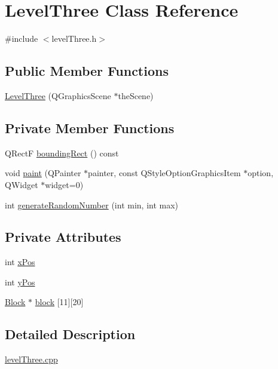 \hypertarget{class_level_three}{
\section{LevelThree Class Reference}
\label{class_level_three}
}


{\ttfamily \#include $<$levelThree.h$>$}\subsection*{Public Member Functions}
\begin{DoxyCompactItemize}
\item 
\hyperlink{class_level_three_a75bf86c7d294935953252f89586fb1d5}{LevelThree} (QGraphicsScene $\ast$theScene)
\end{DoxyCompactItemize}
\subsection*{Private Member Functions}
\begin{DoxyCompactItemize}
\item 
QRectF \hyperlink{class_level_three_a6c6267a96819454c27eb39c0b5ea8393}{boundingRect} () const 
\item 
void \hyperlink{class_level_three_ae0252fbf12113d716253572d25292e28}{paint} (QPainter $\ast$painter, const QStyleOptionGraphicsItem $\ast$option, QWidget $\ast$widget=0)
\item 
int \hyperlink{class_level_three_aa24bdff687183528fa201cdcbf191e33}{generateRandomNumber} (int min, int max)
\end{DoxyCompactItemize}
\subsection*{Private Attributes}
\begin{DoxyCompactItemize}
\item 
int \hyperlink{class_level_three_aaa81170987ff08168cb526f05bfb6c3c}{xPos}
\item 
int \hyperlink{class_level_three_ab7a05706e5bfa2fc595b1fc27a9da64d}{yPos}
\item 
\hyperlink{class_block}{Block} $\ast$ \hyperlink{class_level_three_a937d4711d32721bf7b0a6d30b9766368}{block} \mbox{[}11\mbox{]}\mbox{[}20\mbox{]}
\end{DoxyCompactItemize}


\subsection{Detailed Description}
\hyperlink{level_three_8cpp}{levelThree.cpp}


